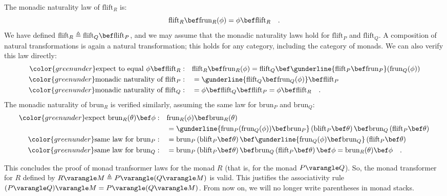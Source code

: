 The monadic naturality law of $\text{flift}_{R}$ is:
\[
\text{flift}_{R}\bef\text{frun}_{R}(\phi)=\phi\bef\text{flift}_{R}\quad.
\]
We have defined $\text{flift}_{R}\triangleq\text{flift}_{Q}\bef\text{flift}_{P}$,
and we may assume that the monadic naturality laws hold for $\text{flift}_{P}$
and $\text{flift}_{Q}$. A composition of natural transformations
is again a natural transformation; this holds for any category, including
the category of monads. We can also verify this law directly:
\begin{align*}
{\color{greenunder}\text{expect to equal }\phi\bef\text{flift}_{R}:}\quad & \text{flift}_{R}\bef\text{frun}_{R}(\phi)=\text{flift}_{Q}\bef\gunderline{\text{flift}_{P}\bef\text{frun}_{P}}(\text{frun}_{Q}(\phi))\\
{\color{greenunder}\text{monadic naturality of }\text{flift}_{P}:}\quad & =\gunderline{\text{flift}_{Q}\bef\text{frun}_{Q}(\phi)}\bef\text{flift}_{P}\\
{\color{greenunder}\text{monadic naturality of }\text{flift}_{Q}:}\quad & =\phi\bef\text{flift}_{Q}\bef\text{flift}_{P}=\phi\bef\text{flift}_{R}\quad.
\end{align*}
The monadic naturality of $\text{brun}_{R}$ is verified similarly,
assuming the same law for $\text{brun}_{P}$ and $\text{brun}_{Q}$:
\begin{align*}
{\color{greenunder}\text{expect }\text{brun}_{R}(\theta)\bef\phi:}\quad & \text{frun}_{R}(\phi)\bef\text{brun}_{R}(\theta)\\
 & =\gunderline{\text{frun}_{P}(\text{frun}_{Q}(\phi))\bef\text{brun}_{P}}\left(\text{blift}_{P}\bef\theta\right)\bef\text{brun}_{Q}\left(\text{flift}_{P}\bef\theta\right)\\
{\color{greenunder}\text{same law for }\text{brun}_{P}:}\quad & =\text{brun}_{P}\left(\text{blift}_{P}\bef\theta\right)\bef\gunderline{\text{frun}_{Q}(\phi)\bef\text{brun}_{Q}}\left(\text{flift}_{P}\bef\theta\right)\\
{\color{greenunder}\text{same law for }\text{brun}_{Q}:}\quad & =\text{brun}_{P}\left(\text{blift}_{P}\bef\theta\right)\bef\text{brun}_{Q}\left(\text{flift}_{P}\bef\theta\right)\bef\phi=\text{brun}_{R}(\theta)\bef\phi\quad.
\end{align*}

This concludes the proof of monad tranfsormer laws for the monad $R$
(that is, for the monad $P\varangle Q$). So, the monad transformer
for $R$ defined by $R\varangle M\triangleq P\varangle(Q\varangle M)$
is valid. This justifies the associativity rule $(P\varangle Q)\varangle M=P\varangle(Q\varangle M)$.
From now on, we will no longer write parentheses in monad stacks.

